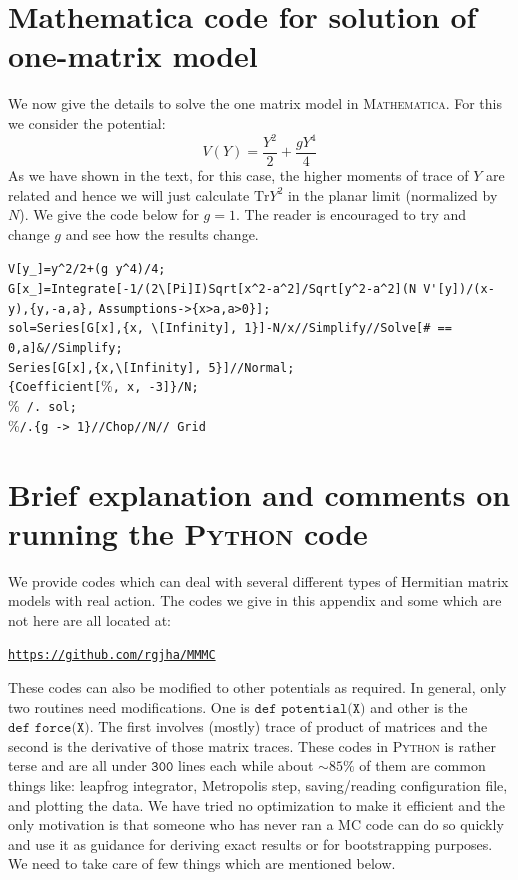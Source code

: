 \documentclass[11pt]{article}
\newcommand{\PY}{\textsc{Python }}
\begin{document}
\section{Mathematica code for solution of one-matrix model}
We now give the details to solve the one matrix model in \textsc{Mathematica}. For this we consider the potential:
\[ V(Y) = \frac{Y^2}{2} + \frac{gY^4}{4} \] 
As we have shown in the text, for this case, the higher moments of trace of $Y$ are related and hence we will just calculate $\mbox{Tr}Y^2$ in the planar limit (normalized by $N$). We give the code below for $g=1$. The reader is encouraged to try and change $g$ and see how the results change.

\begin{mdframed}[backgroundcolor=magenta!3] 
	\begin{footnotesize} 
		\noindent 
		\verb"V[y_]=y^2/2+(g y^4)/4;"\\
		\verb"G[x_]=Integrate[-1/(2\[Pi]I)Sqrt[x^2-a^2]/Sqrt[y^2-a^2](N V'[y])/(x-y),{y,-a,a}," \newline
		\verb"Assumptions->{x>a,a>0}];"\\
		\verb"sol=Series[G[x],{x, \[Infinity], 1}]-N/x//Simplify//Solve[# == 0,a]&//Simplify; "\\
		\verb"Series[G[x],{x,\[Infinity], 5}]//Normal; "\\
		\verb"{Coefficient["\%\verb", x, -3]}/N;"\\
		\%\verb" /. sol;"\\
		\%\verb"/.{g -> 1}//Chop//N// Grid"
	\end{footnotesize} 
\end{mdframed}

\section{Brief explanation and comments on 
running the \PY code}
We provide codes which can deal with several different types of 
Hermitian matrix models with real action. The codes we give 
in this appendix and some which are not here are all located at:  
\begin{center} \texttt{\href{https://github.com/rgjha/MMMC}{https://github.com/rgjha/MMMC}} \end{center}
These codes can also be modified to other potentials as required.
In general, only two routines need modifications. 
One is $\texttt{def potential(X)}$ and 
other is the $\texttt{def force(X)}$. The first involves (mostly) 
trace of product of matrices and the second is the derivative of those matrix traces. 
These codes in \PY is rather terse
and are all under $\texttt{300}$ lines each
while about $\sim 85\%$ of them are common things like:
leapfrog integrator, Metropolis step, saving/reading configuration file, 
and plotting the data. We have tried no optimization to make it efficient and the
only motivation is that someone who has never ran a MC code can do
so quickly and use it as guidance for deriving exact results or for
bootstrapping purposes. We need to take care of few things which are 
mentioned below.  
\end{document}
